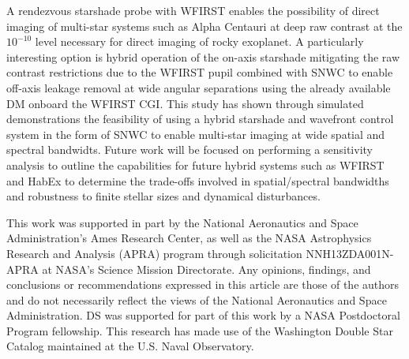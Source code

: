 \documentclass[]{spie}  %
\begin{document}
A rendezvous starshade probe with WFIRST enables the possibility of direct imaging of multi-star systems such as Alpha Centauri at deep raw contrast at the $10^{-10}$ level necessary for  direct imaging of rocky exoplanet. A particularly interesting option is hybrid operation of the on-axis starshade mitigating the raw contrast restrictions due to the WFIRST pupil combined with SNWC to enable off-axis leakage removal at wide angular separations using the already available DM onboard the WFIRST CGI. This study has shown through simulated demonstrations the feasibility of using a hybrid starshade and wavefront control system in the form of SNWC to enable multi-star imaging at wide spatial and spectral bandwidts. Future work will be focused on performing a sensitivity analysis to outline the capabilities for future hybrid systems such as WFIRST and HabEx to determine the trade-offs involved in spatial/spectral bandwidths and robustness to finite stellar sizes and dynamical disturbances.


\acknowledgments

This work was supported in part by the National Aeronautics and Space Administration's Ames Research Center, as well as the NASA Astrophysics Research and Analysis (APRA) program through solicitation NNH13ZDA001N-APRA at NASA's Science Mission Directorate. Any opinions, findings, and conclusions or recommendations expressed in this article are those of the authors and do not necessarily reflect the views of the National Aeronautics and Space Administration. DS was supported for part of this work by a NASA Postdoctoral Program fellowship. This research has made use of the Washington Double Star Catalog maintained at the U.S. Naval Observatory. 



\end{document}

